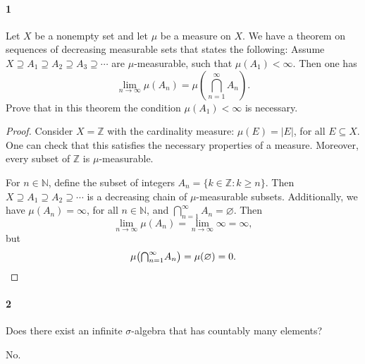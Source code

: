 \documentclass[12pt]{article}
\newlength{\myparskip}
\newenvironment{fullbox}{\begin{lrbox}{\savefullbox}\begin{minipage}{\dimexpr\textwidth-2\fboxsep\relax}\setlength{\parskip}{\myparskip}}{\end{minipage}\end{lrbox}\framebox[\textwidth]{\usebox{\savefullbox}}}
\newenvironment{pbox}[1][]{\begin{fullbox}\ifx#1\empty\else\paragraph{#1}\fi}{\end{fullbox}}
\newcommand{\N}{\mathbb{N}}
\newcommand{\Z}{\mathbb{Z}}
\renewcommand{\emptyset}{\varnothing}
\newcommand{\<}{\langle}
\renewcommand{\>}{\rangle}
\theoremstyle{definition}
\newcommand{\tbigcap}{{\textstyle\bigcap}}
\newcommand{\qty}[2][0]{
    \ifnum #1=0 (#2) \fi
    \ifnum #1=1 \big(#2\big) \fi
    \ifnum #1=2 \Big(#2\Big) \fi
    \ifnum #1=3 \bigg(#2\bigg) \fi
    \ifnum #1=4 \Bigg(#2\Bigg) \fi
}
\begin{document}
\thispagestyle{title}

\begin{pbox}[1]
    Let $X$ be a nonempty set and let $\mu$ be a measure on $X$. We have a theorem on sequences of decreasing measurable sets that states the following: Assume $X \supseteq A_1 \supseteq A_2 \supseteq A_3 \supseteq \cdots$ are $\mu$-measurable, such that $\mu(A_1) < \infty$. Then one has
    \[
        \lim_{n\to\infty} \mu(A_n) = \mu(\tbigcap_{n=1}^{\infty} A_n).
    \]
    Prove that in this theorem the condition $\mu(A_1) < \infty$ is necessary.
\end{pbox}

\begin{proof}
    Consider $X = \Z$ with the cardinality measure: $\mu(E) = |E|$, for all $E \subseteq X$. One can check that this satisfies the necessary properties of a measure. Moreover, every subset of $\Z$ is $\mu$-measurable.
    
    For $n \in \N$, define the subset of integers $A_n = \{k \in \Z : k \geq n\}$. Then $X \supseteq A_1 \supseteq A_2 \supseteq \cdots$ is a decreasing chain of $\mu$-measurable subsets. Additionally, we have $\mu(A_n) = \infty$, for all $n \in \N$, and $\bigcap_{n=1}^{\infty} A_n = \emptyset$. Then
    \[
        \lim_{n\to\infty} \mu(A_n) = \lim_{n\to\infty} \infty = \infty,
    \]
    but
    \[
        \mu\qty[1]{\tbigcap_{n=1}^{\infty} A_n} = \mu(\emptyset) = 0.
    \]

\end{proof}


\newpage
\begin{pbox}[2]
    Does there exist an infinite $\sigma$-algebra that has countably many elements?
\end{pbox}

No.
\end{document}
